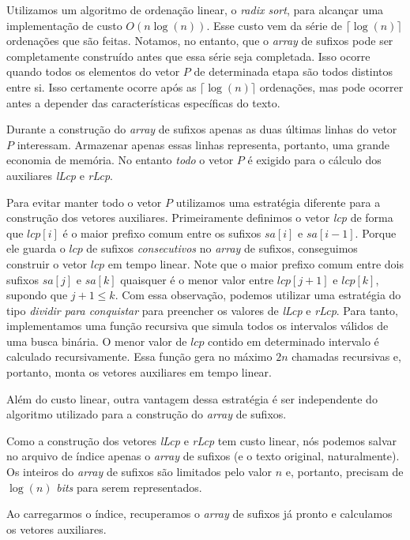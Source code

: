 \documentclass[]{article}
\begin{document}
Utilizamos um algoritmo de ordenação linear, o \textit{radix sort}, para alcançar uma implementação de custo $O(n\log(n))$. Esse custo vem da série de $\lceil\log(n)\rceil$ ordenações que são feitas. Notamos, no entanto, que o \textit{array} de sufixos pode ser completamente construído antes que essa série seja completada. Isso ocorre quando todos os elementos do vetor $P$ de determinada etapa são todos distintos entre si. Isso certamente ocorre após as $\lceil\log(n)\rceil$ ordenações, mas pode ocorrer antes a depender das características específicas do texto.

Durante a construção do \textit{array} de sufixos apenas as duas últimas linhas do vetor $P$ interessam. Armazenar apenas essas linhas representa, portanto, uma grande economia de memória. No entanto \textit{todo} o vetor $P$ é exigido para o cálculo dos auxiliares \textit{lLcp} e \textit{rLcp}.

Para evitar manter todo o vetor $P$ utilizamos uma estratégia diferente para a construção dos vetores auxiliares. Primeiramente definimos o vetor \textit{lcp} de forma que $lcp[i]$ é o maior prefixo comum entre os sufixos $sa[i]$ e $sa[i-1]$. Porque ele guarda o $lcp$ de sufixos \textit{consecutivos} no \textit{array} de sufixos, conseguimos construir o vetor $lcp$ em tempo linear. Note que o maior prefixo comum entre dois sufixos $sa[j]$ e $sa[k]$ quaisquer é o menor valor entre $lcp[j+1]$ e $lcp[k]$, supondo que $j+1 \leq k$. Com essa observação, podemos utilizar uma estratégia do tipo \textit{dividir para conquistar} para preencher os valores de \textit{lLcp} e \textit{rLcp}. Para tanto, implementamos uma função recursiva que simula todos os intervalos válidos de uma busca binária. O menor valor de $lcp$ contido em determinado intervalo é calculado recursivamente. Essa função gera no máximo $2n$ chamadas recursivas e, portanto, monta os vetores auxiliares em tempo linear.

Além do custo linear, outra vantagem dessa estratégia é ser independente do algoritmo utilizado para a construção do \textit{array} de sufixos.

Como a construção dos vetores \textit{lLcp} e \textit{rLcp} tem custo linear, nós podemos salvar no arquivo de índice apenas o \textit{array} de sufixos (e o texto original, naturalmente). Os inteiros do \textit{array} de sufixos são limitados pelo valor $n$ e, portanto, precisam de $\log(n)$ \textit{bits} para serem representados. 

Ao carregarmos o índice, recuperamos o \textit{array} de sufixos já pronto e calculamos os vetores auxiliares.
\end{document}
